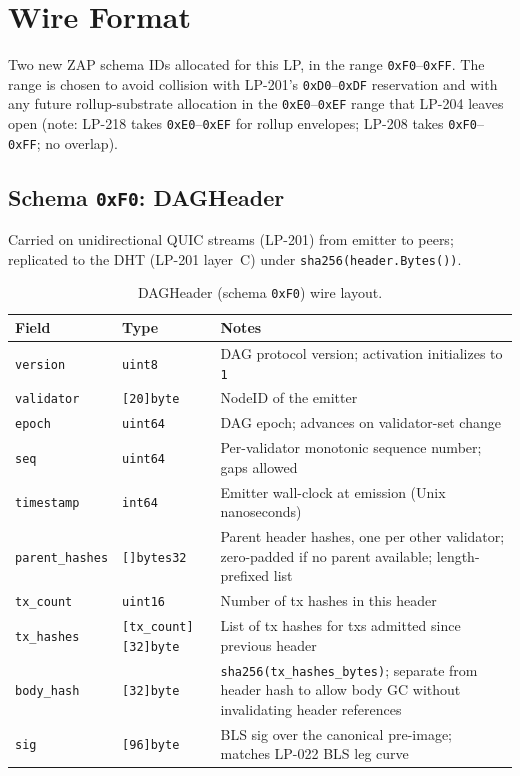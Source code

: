 \section{Wire Format}

Two new ZAP schema IDs allocated for this LP, in the range
\texttt{0xF0}--\texttt{0xFF}. The range is chosen to avoid collision
with LP-201's \texttt{0xD0}--\texttt{0xDF} reservation and with any
future rollup-substrate allocation in the \texttt{0xE0}--\texttt{0xEF}
range that LP-204 leaves open (note: LP-218 takes
\texttt{0xE0}--\texttt{0xEF} for rollup envelopes; LP-208 takes
\texttt{0xF0}--\texttt{0xFF}; no overlap).

\subsection{Schema \texttt{0xF0}: DAGHeader}

Carried on unidirectional QUIC streams (LP-201) from emitter to
peers; replicated to the DHT (LP-201 layer~C) under
\texttt{sha256(header.Bytes())}.

\begin{table}[h]
\centering
\small
\begin{tabular}{@{}llp{6.5cm}@{}}
\toprule
\textbf{Field} & \textbf{Type} & \textbf{Notes} \\
\midrule
\texttt{version} & \texttt{uint8} & DAG protocol version; activation initializes to \texttt{1} \\
\texttt{validator} & \texttt{[20]byte} & NodeID of the emitter \\
\texttt{epoch} & \texttt{uint64} & DAG epoch; advances on validator-set change \\
\texttt{seq} & \texttt{uint64} & Per-validator monotonic sequence number; gaps allowed \\
\texttt{timestamp} & \texttt{int64} & Emitter wall-clock at emission (Unix nanoseconds) \\
\texttt{parent\_hashes} & \texttt{[]bytes32} & Parent header hashes, one per other validator; zero-padded if no parent available; length-prefixed list \\
\texttt{tx\_count} & \texttt{uint16} & Number of tx hashes in this header \\
\texttt{tx\_hashes} & \texttt{[tx\_count][32]byte} & List of tx hashes for txs admitted since previous header \\
\texttt{body\_hash} & \texttt{[32]byte} & \texttt{sha256(tx\_hashes\_bytes)}; separate from header hash to allow body GC without invalidating header references \\
\texttt{sig} & \texttt{[96]byte} & BLS sig over the canonical pre-image; matches LP-022 BLS leg curve \\
\bottomrule
\end{tabular}
\caption{DAGHeader (schema \texttt{0xF0}) wire layout.}
\label{tab:dagheader}
\end{table}

